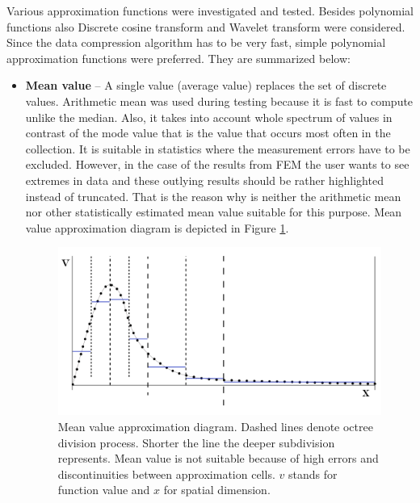 Various approximation functions were investigated and tested. Besides polynomial functions also Discrete cosine transform \cite{Roma2011} and Wavelet transform \cite{Li2014} were considered. Since the data compression algorithm has to be very fast, simple polynomial approximation functions were preferred. They are summarized below:

\begin{itemize}
  \item \textbf{Mean value} -- A single value (average value) replaces the set of discrete values. Arithmetic mean was used during testing because it is fast to compute unlike the median. Also, it takes into account whole spectrum of values in contrast of the mode value that is the value that occurs most often in the collection. It is suitable in statistics where the measurement errors have to be excluded. However, in the case of the results from FEM the user wants to see extremes in data and these outlying results should be rather highlighted instead of truncated. That is the reason why is neither the arithmetic mean nor other statistically estimated mean value suitable for this purpose. Mean value approximation diagram is depicted in Figure \ref{fig:mean-value-approx}.

  \begin{figure}[H]
  \centering
  \includegraphics[width=\textwidth]{figures/chapter-approximation/figure4}
  \decoRule
  \caption[Mean value approximation diagram.]{Mean value approximation diagram. Dashed lines denote octree division process. Shorter the line the deeper subdivision represents. Mean value is not suitable because of high errors and discontinuities between approximation cells. $v$ stands for function value and $x$ for spatial dimension.}
  \label{fig:mean-value-approx}
  \end{figure}


\end{itemize}
